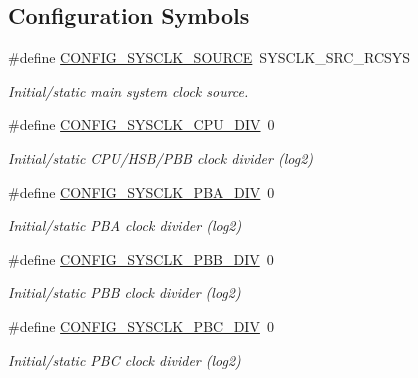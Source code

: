 \subsection*{\-Configuration \-Symbols}
\begin{DoxyCompactItemize}
\item 
\#define \hyperlink{group__sysclk__group_ga7bb6bbe88b7fb398ef8f0befe936e0e7}{\-C\-O\-N\-F\-I\-G\-\_\-\-S\-Y\-S\-C\-L\-K\-\_\-\-S\-O\-U\-R\-C\-E}~\-S\-Y\-S\-C\-L\-K\-\_\-\-S\-R\-C\-\_\-\-R\-C\-S\-Y\-S
\begin{DoxyCompactList}\small\item\em \-Initial/static main system clock source. \end{DoxyCompactList}\item 
\#define \hyperlink{group__sysclk__group_gaf8bcf7e1ee2ebd2829ebc31be507c6da}{\-C\-O\-N\-F\-I\-G\-\_\-\-S\-Y\-S\-C\-L\-K\-\_\-\-C\-P\-U\-\_\-\-D\-I\-V}~0
\begin{DoxyCompactList}\small\item\em \-Initial/static \-C\-P\-U/\-H\-S\-B/\-P\-B\-B clock divider (log2) \end{DoxyCompactList}\item 
\#define \hyperlink{group__sysclk__group_gaa952d8094a06be420e244e68286c2dbf}{\-C\-O\-N\-F\-I\-G\-\_\-\-S\-Y\-S\-C\-L\-K\-\_\-\-P\-B\-A\-\_\-\-D\-I\-V}~0
\begin{DoxyCompactList}\small\item\em \-Initial/static \-P\-B\-A clock divider (log2) \end{DoxyCompactList}\item 
\#define \hyperlink{group__sysclk__group_ga50962c914daa31fbc279cd4bccf66f98}{\-C\-O\-N\-F\-I\-G\-\_\-\-S\-Y\-S\-C\-L\-K\-\_\-\-P\-B\-B\-\_\-\-D\-I\-V}~0
\begin{DoxyCompactList}\small\item\em \-Initial/static \-P\-B\-B clock divider (log2) \end{DoxyCompactList}\item 
\#define \hyperlink{group__sysclk__group_gaa31e8248ac7b461b19f7ec827674d16c}{\-C\-O\-N\-F\-I\-G\-\_\-\-S\-Y\-S\-C\-L\-K\-\_\-\-P\-B\-C\-\_\-\-D\-I\-V}~0
\begin{DoxyCompactList}\small\item\em \-Initial/static \-P\-B\-C clock divider (log2) \end{DoxyCompactList}\end{DoxyCompactItemize}
